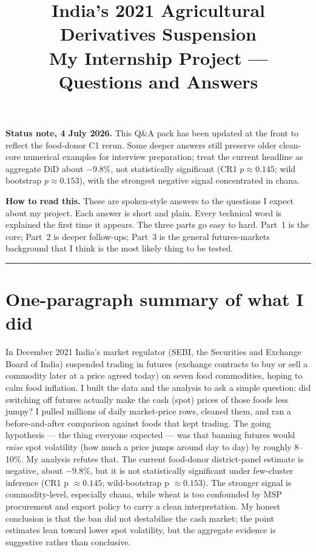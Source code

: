 \documentclass[11pt]{article}
\title{\textbf{India's 2021 Agricultural Derivatives Suspension}\\[4pt]
\large My Internship Project --- Questions and Answers}
\author{}
\date{}
\begin{document}
\maketitle

\noindent\textbf{Status note, 4 July 2026.} This Q\&A pack has been updated at the
front to reflect the food-donor C1 rerun. Some deeper answers still preserve older
clean-core numerical examples for interview preparation; treat the current headline
as aggregate DiD about $-9.8\%$, not statistically significant (CR1
$p \approx 0.145$; wild bootstrap $p \approx 0.153$), with the strongest negative
signal concentrated in chana.

\bigskip

\noindent\textbf{How to read this.} These are spoken-style answers to the questions I expect about
my project. Each answer is short and plain. Every technical word is explained the first time it
appears. The three parts go easy to hard. Part~1 is the core; Part~2 is deeper follow-ups; Part~3 is
the general futures-markets background that I think is the most likely thing to be tested.

\bigskip
\hrule
\bigskip

\section*{One-paragraph summary of what I did}

In December 2021 India's market regulator (SEBI, the Securities and Exchange Board of India)
suspended trading in futures (exchange contracts to buy or sell a commodity later at a price agreed
today) on seven food commodities, hoping to calm food inflation. I built the data and the analysis
to ask a simple question: did switching off futures actually make the cash (spot) prices of those
foods less jumpy? I pulled millions of daily market-price rows, cleaned them, and ran a
before-and-after comparison against foods that kept trading. The going hypothesis --- the thing
everyone expected --- was that banning futures would \emph{raise} spot volatility (how much a price
jumps around day to day) by roughly 8--10\%. My analysis refutes that. The current food-donor
district-panel estimate is negative, about $-9.8\%$, but it is not statistically significant under
few-cluster inference (CR1 p $\approx 0.145$; wild-bootstrap p $\approx 0.153$). The stronger signal
is commodity-level, especially chana, while wheat is too confounded by MSP procurement and export
policy to carry a clean interpretation. My honest conclusion is that the ban did not destabilise the
cash market; the point estimates lean toward lower spot volatility, but the aggregate evidence is
suggestive rather than conclusive.
\end{document}
